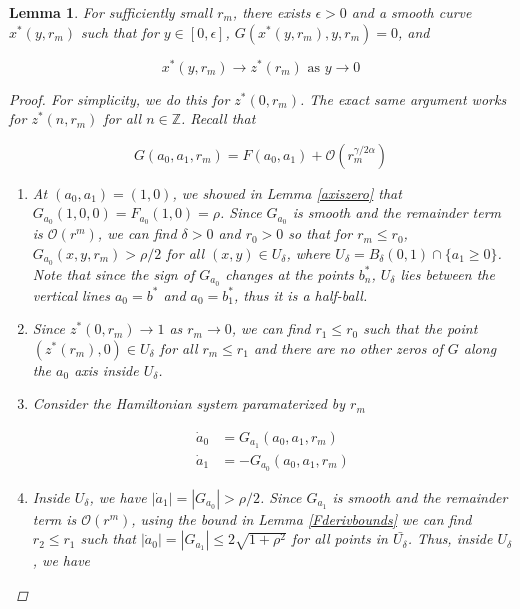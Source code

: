\documentclass[12pt]{article}
\def\Z{{\mathbb Z}}
\newtheorem{lemma}{Lemma}
\begin{document}
\begin{lemma}\label{nearzstar}
For sufficiently small $r_m$, there exists $\epsilon > 0$ and a smooth curve $x^*(y, r_m)$ such that for $y \in [0, \epsilon]$, $G(x^*(y, r_m), y, r_m) = 0$, and

\[
x^*(y, r_m) \rightarrow z^*(r_m) \text{ as } y \rightarrow 0
\]

\begin{proof}

For simplicity, we do this for $z^*(0, r_m)$. The exact same argument works for $z^*(n, r_m)$ for all $n \in \Z$. Recall that 

\[
G(a_0, a_1, r_m) = F(a_0, a_1) + \mathcal{O}(r_m^{\gamma / 2 \alpha})
\]

\begin{enumerate}

\item At $(a_0, a_1) = (1, 0)$, we showed in Lemma \ref{axiszero} that $G_{a_0}(1, 0, 0) = F_{a_0}(1, 0) = \rho$. Since $G_{a_0}$ is smooth and the remainder term is $\mathcal{O}(r^m)$, we can find $\delta > 0$ and $r_0 > 0$ so that for $r_m \leq r_0$, $G_{a_0}(x,y,r_m) > \rho/2$ for all $(x,y) \in U_\delta$, where $U_\delta = B_\delta(0, 1) \cap \{ a_1 \geq 0\}$.  Note that since the sign of $G_{a_0}$ changes at the points $b_n^*$, $U_\delta$ lies between the vertical lines $a_0 = b^*$ and $a_0 = b_1^*$, thus it is a half-ball.

\item Since $z^*(0, r_m) \rightarrow 1$ as $r_m \rightarrow 0$, we can find $r_1 \leq r_0$ such that the point $(z^*(r_m), 0) \in U_\delta$ for all $r_m \leq r_1$ and there are no other zeros of $G$ along the $a_0$ axis inside $U_\delta$.

\item Consider the Hamiltonian system paramaterized by $r_m$

\begin{align}
\dot a_0 &= G_{a_1}(a_0, a_1, r_m)\\
\dot a_1 &= -G_{a_0}(a_0, a_1, r_m)
\end{align}

\item Inside $U_\delta$, we have $|\dot a_1| = |G_{a_0}| > \rho/2$. Since $G_{a_1}$ is smooth and the remainder term is $\mathcal{O}(r^m)$, using the bound in Lemma \ref{Fderivbounds} we can find $r_2 \leq r_1$ such that $|\dot a_0| = |G_{a_1}| \leq 2 \sqrt{1 + \rho^2}$ for all points in $\bar{U_\delta}$. Thus, inside $U_\delta$, we have


\end{enumerate}
\end{proof}
\end{lemma}
\end{document}
